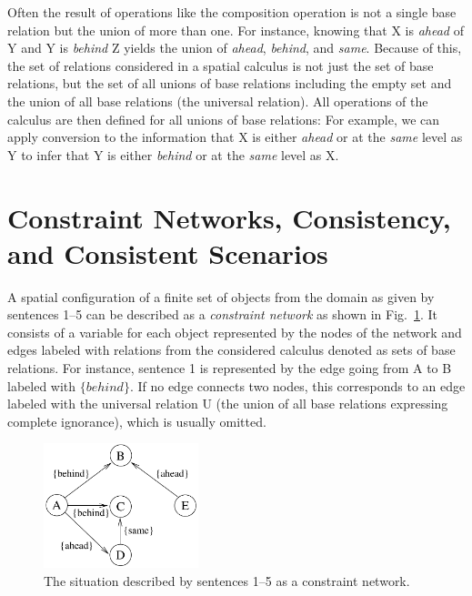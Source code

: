 \documentclass[headsepline]{scrreprt}
\theoremstyle{definition}
\begin{document}
Often the result of operations like the composition operation is
not a single base relation but the union of more than one. For
instance, knowing that X is \emph{ahead} of Y and Y is \emph{behind}
Z yields the union of \emph{ahead}, \emph{behind}, and \emph{same}.
Because of this, the set of relations considered in a spatial
calculus is not just the set of base relations, but the set
of all unions of base relations including the empty set and
the union of all base relations (the universal relation).
All operations of the calculus are then defined for all unions
of base relations: For example, we can apply conversion to
the information that X is either \emph{ahead} or at the
\emph{same} level as Y to infer that Y is either \emph{behind}
or at the \emph{same} level as X.

\section{Constraint Networks, Consistency, and Consistent Scenarios}

A spatial configuration of a finite set of objects from the domain
as given by sentences 1--5 can be described as a \emph{constraint
network} as shown in Fig.~\ref{fig:br1}. It consists of a variable for each
object represented by the nodes of the network and edges
labeled with relations from the considered calculus denoted
as sets of base relations. For instance, sentence 1 is
represented by the edge going from A to B labeled with
$\{behind\}$. If no edge connects two nodes, this corresponds
to an edge labeled with the universal relation U (the union of all base relations expressing complete ignorance), which is
usually omitted.

\begin{figure}[ht]
	\centering
	\includegraphics[width=0.4\textwidth]{boatrace_cn_1}
	\caption{The situation described by sentences 1--5 as a constraint network. }
	\label{fig:br1}
\end{figure}
\end{document}
